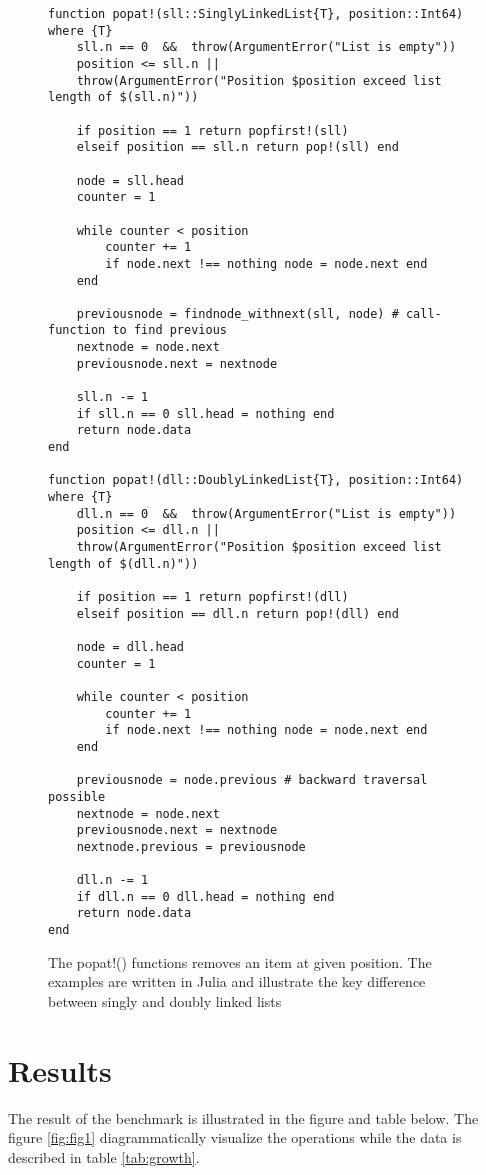 \documentclass[a4paper, 11pt]{article}
\begin{document}
    \begin{figure}[H]
    \centering
    \begin{verbatim}
function popat!(sll::SinglyLinkedList{T}, position::Int64) where {T}
    sll.n == 0  &&  throw(ArgumentError("List is empty"))
    position <= sll.n ||
    throw(ArgumentError("Position $position exceed list length of $(sll.n)"))

    if position == 1 return popfirst!(sll)
    elseif position == sll.n return pop!(sll) end

    node = sll.head
    counter = 1

    while counter < position 
        counter += 1
        if node.next !== nothing node = node.next end 
    end

    previousnode = findnode_withnext(sll, node) # call-function to find previous 
    nextnode = node.next
    previousnode.next = nextnode

    sll.n -= 1
    if sll.n == 0 sll.head = nothing end
    return node.data
end
    
function popat!(dll::DoublyLinkedList{T}, position::Int64) where {T}
    dll.n == 0  &&  throw(ArgumentError("List is empty"))
    position <= dll.n ||
    throw(ArgumentError("Position $position exceed list length of $(dll.n)"))

    if position == 1 return popfirst!(dll)
    elseif position == dll.n return pop!(dll) end

    node = dll.head
    counter = 1

    while counter < position 
        counter += 1
        if node.next !== nothing node = node.next end 
    end

    previousnode = node.previous # backward traversal possible
    nextnode = node.next
    previousnode.next = nextnode
    nextnode.previous = previousnode

    dll.n -= 1
    if dll.n == 0 dll.head = nothing end
    return node.data
end
    \end{verbatim}
    \caption{The popat!() functions removes an item at given position. The
    examples are written in Julia and illustrate the key difference between singly
    and doubly linked lists}
    \label{code:popat!}
    \end{figure}
    
    \section*{Results}
    The result of the benchmark is illustrated in the figure and table below.
    The figure \ref{fig:fig1} diagrammatically visualize the operations while the
    data is described in table \ref{tab:growth}.
    
\end{document}
